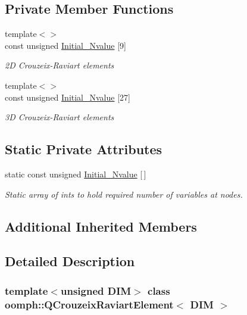 \subsection*{Private Member Functions}
\begin{DoxyCompactItemize}
\item 
{\footnotesize template$<$$>$ }\\const unsigned \hyperlink{classoomph_1_1QCrouzeixRaviartElement_af4b3bbe0a23202e38a06918d32b95b6f}{Initial\+\_\+\+Nvalue} \mbox{[}9\mbox{]}
\begin{DoxyCompactList}\small\item\em 2D Crouzeix-\/\+Raviart elements \end{DoxyCompactList}\item 
{\footnotesize template$<$$>$ }\\const unsigned \hyperlink{classoomph_1_1QCrouzeixRaviartElement_ae0a4b66b8274534987875619895d1ae3}{Initial\+\_\+\+Nvalue} \mbox{[}27\mbox{]}
\begin{DoxyCompactList}\small\item\em 3D Crouzeix-\/\+Raviart elements \end{DoxyCompactList}\end{DoxyCompactItemize}
\subsection*{Static Private Attributes}
\begin{DoxyCompactItemize}
\item 
static const unsigned \hyperlink{classoomph_1_1QCrouzeixRaviartElement_a7facb695d20c987c1c4d47ac16cf24b6}{Initial\+\_\+\+Nvalue} \mbox{[}$\,$\mbox{]}
\begin{DoxyCompactList}\small\item\em Static array of ints to hold required number of variables at nodes. \end{DoxyCompactList}\end{DoxyCompactItemize}
\subsection*{Additional Inherited Members}


\subsection{Detailed Description}
\subsubsection*{template$<$unsigned D\+IM$>$\newline
class oomph\+::\+Q\+Crouzeix\+Raviart\+Element$<$ D\+I\+M $>$}

